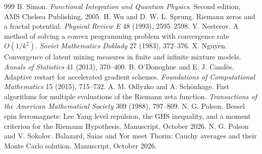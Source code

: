 \begin{thebibliography}{999}
 B. Simon. \emph{Functional Integration and Quantum Physics}. Second edition, AMS Chelsea Publishing, 2005. %
 H. Wu and D. W. L. Sprung. Riemann zeros and a fractal potential. \emph{Physical Review E} 48 (1993), 2595--2598. %
 Y. Nesterov. A method of solving a convex programming problem with convergence rate $O(1/k^2)$. \emph{Soviet Mathematics Doklady} 27 (1983), 372--376.
 X. Nguyen. Convergence of latent mixing measures in finite and infinite mixture models. \emph{Annals of Statistics} 41 (2013), 370--400.
 B. O'Donoghue and E. J. Cand\`es. Adaptive restart for accelerated gradient schemes. \emph{Foundations of Computational Mathematics} 15 (2015), 715--732.
 A. M. Odlyzko and A. Sch\"onhage. Fast algorithms for multiple evaluations of the Riemann zeta function. \emph{Transactions of the American Mathematical Society} 309 (1988), 797--809.
 N. G. Polson. Bessel spin ferromagnets: Lee Yang level repulsion, the GHS inequality, and a moment criterion for the Riemann Hypothesis. Manuscript, October 2026.
 N. G. Polson and V. Sokolov. Balazard, Saias and Yor meet Thorin: Cauchy averages and their Monte Carlo solution. Manuscript, October 2026.

\end{thebibliography}
